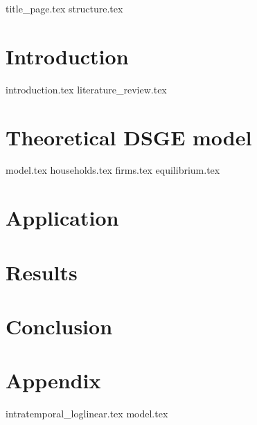 \documentclass[12pt]{article}
\begin{document}
\begin{sloppypar}
{title_page.tex}
\pagebreak
{structure.tex}
\pagebreak
{}
\section{Introduction}
{introduction.tex}
{literature_review.tex}

\section{Theoretical DSGE model}
{model.tex}
{households.tex}
{firms.tex}
{equilibrium.tex}
\section{Application} \label{application}
\section{Results}
\section{Conclusion}
\section{Appendix}
\appendix 
\renewcommand{\theequation}{A.\arabic{equation}}
{intratemporal_loglinear.tex}
{model.tex}

\end{sloppypar}
\end{document}
